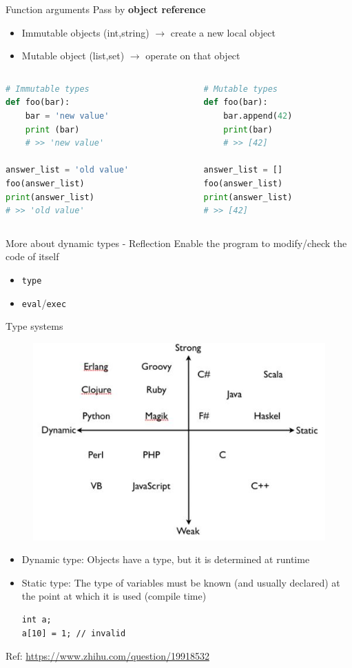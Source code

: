 \documentclass{../TexTemplate/myslide}
\begin{document}
\begin{frame}[fragile]{Function arguments}
Pass by \textbf{object reference}
\begin{itemize}
	\item Immutable objects (int,string) $\to$ create a new local object
	\item Mutable object (list,set) $\to$ operate on that object
\end{itemize}
\begin{columns}
\begin{column}{0.5\linewidth}
\begin{lstlisting}[language=python]
# Immutable types
def foo(bar):
    bar = 'new value'
    print (bar)
    # >> 'new value'

answer_list = 'old value'
foo(answer_list)
print(answer_list)
# >> 'old value'
\end{lstlisting}
\end{column}
\begin{column}{0.5\linewidth}
\begin{lstlisting}[language=python]
# Mutable types
def foo(bar):
    bar.append(42)
    print(bar)
    # >> [42]

answer_list = []
foo(answer_list)
print(answer_list)
# >> [42]
\end{lstlisting}
\end{column}
\end{columns}
\end{frame}

\begin{frame}[fragile]{More about dynamic types - Reflection}
Enable the program to modify/check the code of itself
\begin{itemize}
	\item \verb'type'
	\item \verb'eval'/\verb'exec'
\end{itemize}
\end{frame}

\begin{frame}[fragile]{Type systems}
\begin{figure}
\centering
\includegraphics[width=0.4\linewidth]{fig/PL_types.jpg}
\end{figure}
\small
\begin{itemize}
	\item Dynamic type: Objects have a type, but it is determined at runtime
	\item Static type: The type of variables must be known (and usually declared) at the point at which it is used (compile time)
\begin{lstlisting}
int a;
a[10] = 1; // invalid
\end{lstlisting}
\end{itemize}
\small * Ref: \url{https://www.zhihu.com/question/19918532}
\end{frame}
\end{document}
